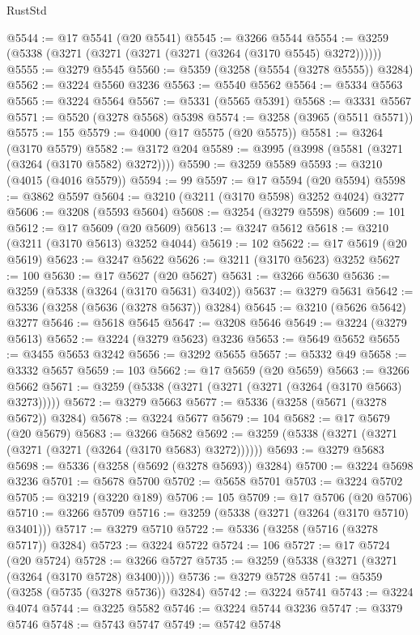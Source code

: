 \begin{lexlean}{RustStd}
\begin{coremodule}
@5544 := @17 @5541 (@20 @5541)
@5545 := @3266 @5544
@5554 := @3259 (@5338 (@3271 (@3271 (@3271 (@3271 (@3264 (@3170 @5545) @3272))))))
@5555 := @3279 @5545
@5560 := @5359 (@3258 (@5554 (@3278 @5555)) @3284)
@5562 := @3224 @5560 @3236
@5563 := @5540 @5562
@5564 := @5334 @5563
@5565 := @3224 @5564
@5567 := @5331 (@5565 @5391)
@5568 := @3331 @5567
@5571 := @5520 (@3278 @5568) @5398
@5574 := @3258 (@3965 (@5511 @5571))
@5575 := 155
@5579 := @4000 (@17 @5575 (@20 @5575))
@5581 := @3264 (@3170 @5579)
@5582 := @3172 @204
@5589 := @3995 (@3998 (@5581 (@3271 (@3264 (@3170 @5582) @3272))))
@5590 := @3259 @5589
@5593 := @3210 (@4015 (@4016 @5579))
@5594 := 99
@5597 := @17 @5594 (@20 @5594)
@5598 := @3862 @5597
@5604 := @3210 (@3211 (@3170 @5598) @3252 @4024) @3277
@5606 := @3208 (@5593 @5604)
@5608 := @3254 (@3279 @5598)
@5609 := 101
@5612 := @17 @5609 (@20 @5609)
@5613 := @3247 @5612
@5618 := @3210 (@3211 (@3170 @5613) @3252 @4044)
@5619 := 102
@5622 := @17 @5619 (@20 @5619)
@5623 := @3247 @5622
@5626 := @3211 (@3170 @5623) @3252
@5627 := 100
@5630 := @17 @5627 (@20 @5627)
@5631 := @3266 @5630
@5636 := @3259 (@5338 (@3264 (@3170 @5631) @3402))
@5637 := @3279 @5631
@5642 := @5336 (@3258 (@5636 (@3278 @5637)) @3284)
@5645 := @3210 (@5626 @5642) @3277
@5646 := @5618 @5645
@5647 := @3208 @5646
@5649 := @3224 (@3279 @5613)
@5652 := @3224 (@3279 @5623) @3236
@5653 := @5649 @5652
@5655 := @3455 @5653 @3242
@5656 := @3292 @5655
@5657 := @5332 @49
@5658 := @3332 @5657
@5659 := 103
@5662 := @17 @5659 (@20 @5659)
@5663 := @3266 @5662
@5671 := @3259 (@5338 (@3271 (@3271 (@3271 (@3264 (@3170 @5663) @3273)))))
@5672 := @3279 @5663
@5677 := @5336 (@3258 (@5671 (@3278 @5672)) @3284)
@5678 := @3224 @5677
@5679 := 104
@5682 := @17 @5679 (@20 @5679)
@5683 := @3266 @5682
@5692 := @3259 (@5338 (@3271 (@3271 (@3271 (@3271 (@3264 (@3170 @5683) @3272))))))
@5693 := @3279 @5683
@5698 := @5336 (@3258 (@5692 (@3278 @5693)) @3284)
@5700 := @3224 @5698 @3236
@5701 := @5678 @5700
@5702 := @5658 @5701
@5703 := @3224 @5702
@5705 := @3219 (@3220 @189)
@5706 := 105
@5709 := @17 @5706 (@20 @5706)
@5710 := @3266 @5709
@5716 := @3259 (@5338 (@3271 (@3264 (@3170 @5710) @3401)))
@5717 := @3279 @5710
@5722 := @5336 (@3258 (@5716 (@3278 @5717)) @3284)
@5723 := @3224 @5722
@5724 := 106
@5727 := @17 @5724 (@20 @5724)
@5728 := @3266 @5727
@5735 := @3259 (@5338 (@3271 (@3271 (@3264 (@3170 @5728) @3400))))
@5736 := @3279 @5728
@5741 := @5359 (@3258 (@5735 (@3278 @5736)) @3284)
@5742 := @3224 @5741
@5743 := @3224 @4074
@5744 := @3225 @5582
@5746 := @3224 @5744 @3236
@5747 := @3379 @5746
@5748 := @5743 @5747
@5749 := @5742 @5748

\end{coremodule}
\end{lexlean}
